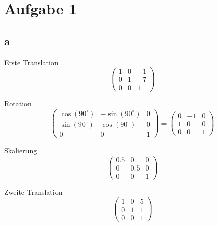 \documentclass[ngerman, a4paper, 12pt]{article}
\begin{document}
\section{Aufgabe 1}
\subsection{a}
Erste Translation
\[
    \begin{pmatrix}
        1 & 0 & -1 \\
        0 & 1 & -7 \\
        0 & 0 & 1
    \end{pmatrix}
\]

Rotation
\[
    \begin{pmatrix}
        \cos(90^{\circ}) & -\sin(90^{\circ}) & 0 \\
        \sin(90^{\circ}) & \cos(90^{\circ})  & 0 \\
        0                & 0                 & 1
    \end{pmatrix}
    =
    \begin{pmatrix}
        0 & -1 & 0 \\
        1 & 0  & 0 \\
        0 & 0  & 1
    \end{pmatrix}
\]

Skalierung
\[
    \begin{pmatrix}
        0.5 & 0   & 0 \\
        0   & 0.5 & 0 \\
        0   & 0   & 1
    \end{pmatrix}
\]

Zweite Translation
\[
    \begin{pmatrix}
        1 & 0 & 5 \\
        0 & 1 & 1 \\
        0 & 0 & 1
    \end{pmatrix}
\]
\end{document}
